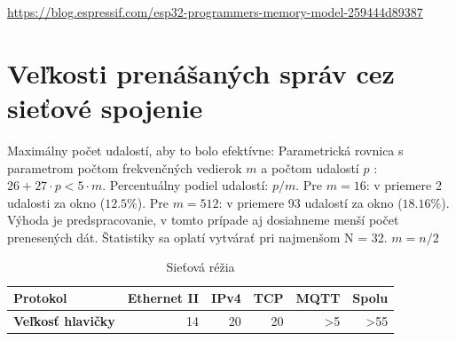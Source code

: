 \url{https://blog.espressif.com/esp32-programmers-memory-model-259444d89387}

\section{Veľkosti prenášaných správ cez sieťové spojenie}
Maximálny počet udalostí, aby to bolo efektívne: Parametrická rovnica s parametrom počtom frekvenčných vedierok $m$ 
a počtom udalostí $p$ : $26 + 27 \cdot p < 5 \cdot m$. Percentuálny podiel udalostí: $p / m$. Pre $m = 16$: v priemere 
2 udalosti za okno ($12.5\%$). Pre $m = 512$: v priemere 93 udalostí za okno ($18.16\%$). Výhoda je predspracovanie, 
v tomto prípade aj dosiahneme menší počet prenesených dát. Štatistiky sa oplatí vytvárať pri najmenšom N = 32. $m = n / 2$

\begin{table}[h]
\def\arraystretch{1.25}
\centering
\begin{tabular}{|l|r|r|r|r|r|}
\hline
\textbf{Protokol}         & \textbf{Ethernet II} & \textbf{IPv4} & \textbf{TCP} & \textbf{MQTT}  & \textbf{Spolu}  \\ \hline
\textbf{Veľkosť hlavičky} & 14                   & 20            & 20           & \textgreater 5 & \textgreater 55 \\ \hline
\end{tabular}
\caption{Sieťová réžia}
\end{table}

